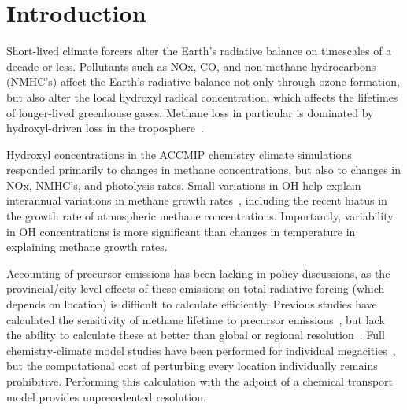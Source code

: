 \section{Introduction}



Short-lived climate forcers alter the Earth's radiative balance on timescales of a decade or less. Pollutants such as NOx, CO, and non-methane hydrocarbons (NMHC's) affect the Earth's radiative balance not only through ozone formation, but also alter the local hydroxyl radical concentration, which affects the lifetimes of longer-lived greenhouse gases. Methane loss in particular is dominated by hydroxyl-driven loss in the troposphere~\citep{ref:kirschke2013}.


Hydroxyl concentrations in the ACCMIP chemistry climate simulations~\citep{ref:voulgarakis2013} responded primarily to changes in methane concentrations, but also to changes in NOx, NMHC's, and photolysis rates. Small variations in OH help explain interannual variations in methane growth rates~\citep{ref:mcnorton2016}, including the recent hiatus in the growth rate of atmospheric methane concentrations. Importantly, variability in OH concentrations is more significant than changes in temperature in explaining methane growth rates.


Accounting of precursor emissions has been lacking in policy discussions, as the provincial/city level effects of these emissions on total radiative forcing (which depends on location) is difficult to calculate efficiently. Previous studies have calculated the sensitivity of methane lifetime to precursor emissions~\citep{ref:holmes2013}, but lack the ability to calculate these at better than global or regional resolution~\citep{ref:naik2005,ref:macintosh2015}. Full chemistry-climate model studies have been performed for individual megacities~\citep{ref:dang2015}, but the computational cost of perturbing every location individually remains prohibitive. Performing this calculation with the adjoint of a chemical transport model provides unprecedented resolution.

